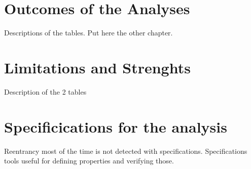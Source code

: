 \section{Outcomes of the Analyses}
Descriptions of the tables.
Put here the other chapter.

\section{Limitations and Strenghts}
Description of the 2 tables 

\section{Specificications for the analysis}
Reentrancy most of the time is not detected with specifications. 
Specifications tools useful for defining properties and verifying those.

